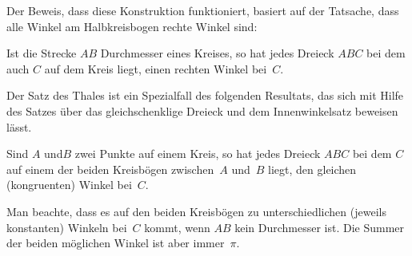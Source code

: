 Der Beweis, dass diese Konstruktion funktioniert, basiert auf der
Tatsache, dass alle Winkel am Halbkreisbogen rechte Winkel sind:

\begin{thm}
Ist die Strecke $AB$ Durchmesser eines Kreises, so hat jedes Dreieck
$ABC$ bei dem auch $C$ auf dem Kreis liegt, einen rechten Winkel
bei~$C$.
\end{thm}

Der Satz des Thales ist ein Spezialfall des folgenden Resultats, 
das sich mit Hilfe des Satzes über das gleichschenklige Dreieck %
und dem Innenwinkelsatz beweisen lässt.

\begin{thm}
Sind $A$ und$B$ zwei Punkte auf einem Kreis, so hat jedes Dreieck
$ABC$ bei dem $C$ auf einem der beiden Kreisbögen zwischen~$A$ und~$B$
liegt, den gleichen (kongruenten) Winkel bei~$C$.
\end{thm}

Man beachte, dass es auf den beiden Kreisbögen zu unterschiedlichen
(jeweils konstanten) Winkeln bei~$C$ kommt, wenn $AB$ kein Durchmesser
ist. Die Summer der beiden möglichen Winkel ist aber immer~$\pi$.

